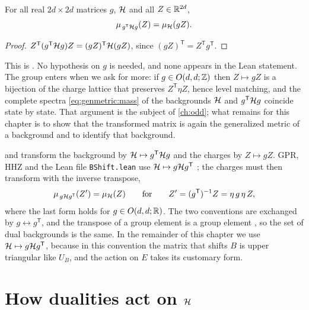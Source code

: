 \begin{proposition}\label{prop:genmetric:cov}
For all real $2d\times2d$ matrices $g$, $\mathcal{H}$ and all $Z\in\mathbb{R}^{2d}$,
\begin{equation}\label{eq:genmetric:cov}
 \mu_{\,g^{\mathsf T}\mathcal{H} g}(Z)=\mu_{\mathcal{H}}(gZ).
\end{equation}
\end{proposition}
\begin{proof}
$Z^{\mathsf T}(g^{\mathsf T}\mathcal{H} g)Z=(gZ)^{\mathsf T}\mathcal{H}(gZ)$, since
$(gZ)^{\mathsf T}=Z^{\mathsf T}g^{\mathsf T}$.
\end{proof}
\noindent This is . No hypothesis on $g$ is needed, and none
appears in the Lean statement. The group enters when we ask for more: if
$g\in O(d,d;\mathbb{Z})$ then $Z\mapsto gZ$ is a bijection of the charge lattice that preserves
$Z^{\mathsf T}\eta Z$, hence level matching, and the complete spectra
\eqref{eq:genmetric:mass} of the backgrounds $\mathcal{H}$ and $g^{\mathsf T}\mathcal{H} g$ coincide state by
state. That argument is the subject of \cref{ch:odd}; what remains for this chapter is to
show that the transformed matrix is again the generalized metric of a background and to
identify that background.

\begin{pitfallbox}
 and  transform the background by
$\mathcal{H}\mapsto g^{\mathsf T}\mathcal{H} g$ and the charges by $Z\mapsto gZ$. GPR, HHZ and the Lean file
\texttt{BShift.lean} use $\mathcal{H}\mapsto g\mathcal{H} g^{\mathsf T}$
; the
charges must then transform with the inverse transpose,
\[
 \mu_{\,g\mathcal{H} g^{\mathsf T}}(Z')=\mu_{\mathcal{H}}(Z)\qquad\text{for}\qquad
 Z'=(g^{\mathsf T})^{-1}Z=\eta\,g\,\eta\,Z,
\]
where the last form holds for $g\in O(d,d;\mathbb{R})$. The two conventions are exchanged by
$g\leftrightarrow g^{\mathsf T}$, and the transpose of a group element is a group element
, so the set of dual backgrounds is the same. In the
remainder of this chapter we use $\mathcal{H}\mapsto g\mathcal{H} g^{\mathsf T}$, because in this convention
the matrix that shifts $B$ is upper triangular like $U_B$, and the action on $E$ takes its
customary form.
\end{pitfallbox}

\section{How dualities act on \texorpdfstring{$\mathcal{H}$}{H}}\label{sec:genmetric:dualities}

